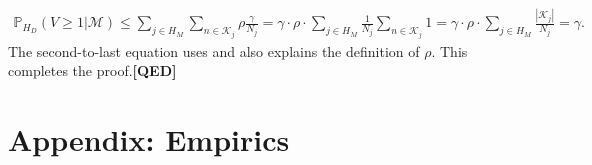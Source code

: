 \documentclass[11pt]{article}
\newcommand{\PP}{\mathbb{P}}
\begin{document}
\begin{align}
	\PP_{H_D}(V\geq 1|\mathcal{M})	
	\leq    \sum_{j\in H_M}\sum_{n\in\mathcal{K}_j}\rho\frac{\gamma}{ N_j} =  \gamma\cdot \rho\cdot \sum_{j\in H_M}\frac{1}{N_j}\sum_{n\in\mathcal{K}_j}1
	=  \gamma\cdot \rho\cdot \sum_{j\in H_M}\frac{|\mathcal{K}_j|}{N_j}
	=\gamma.
\end{align}
The second-to-last equation uses and also explains the definition of $\rho$. This completes the proof.\hfill\textbf{[QED]}

\section{Appendix: Empirics}
\end{document}
